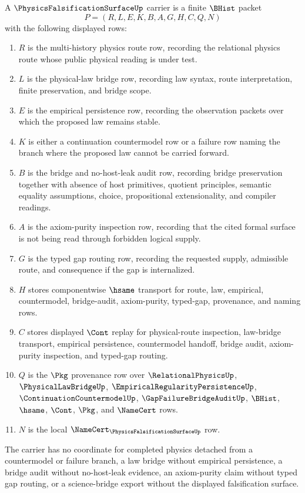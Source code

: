 \begin{definition}
\label{def:physics-falsification-surface-carrier}
A $\PhysicsFalsificationSurfaceUp$ carrier is a finite $\BHist$ packet
$$
P=(R,L,E,K,B,A,G,H,C,Q,N)
$$
with the following displayed rows:
\begin{enumerate}
\item $R$ is the multi-history physics route row, recording the relational physics route whose public physical reading is under test.
\item $L$ is the physical-law bridge row, recording law syntax, route interpretation, finite preservation, and bridge scope.
\item $E$ is the empirical persistence row, recording the observation packets over which the proposed law remains stable.
\item $K$ is either a continuation countermodel row or a failure row naming the branch where the proposed law cannot be carried forward.
\item $B$ is the bridge and no-host-leak audit row, recording bridge preservation together with absence of host primitives, quotient principles, semantic equality assumptions, choice, propositional extensionality, and compiler readings.
\item $A$ is the axiom-purity inspection row, recording that the cited formal surface is not being read through forbidden logical supply.
\item $G$ is the typed gap routing row, recording the requested supply, admissible route, and consequence if the gap is internalized.
\item $H$ stores componentwise $\hsame$ transport for route, law, empirical, countermodel, bridge-audit, axiom-purity, typed-gap, provenance, and naming rows.
\item $C$ stores displayed $\Cont$ replay for physical-route inspection, law-bridge transport, empirical persistence, countermodel handoff, bridge audit, axiom-purity inspection, and typed-gap routing.
\item $Q$ is the $\Pkg$ provenance row over $\RelationalPhysicsUp$, $\PhysicalLawBridgeUp$, $\EmpiricalRegularityPersistenceUp$, $\ContinuationCountermodelUp$, $\GapFailureBridgeAuditUp$, $\BHist$, $\hsame$, $\Cont$, $\Pkg$, and $\NameCert$ rows.
\item $N$ is the local $\NameCert_{\PhysicsFalsificationSurfaceUp}$ row.
\end{enumerate}
The carrier has no coordinate for completed physics detached from a countermodel or failure branch, a law bridge without empirical persistence, a bridge audit without no-host-leak evidence, an axiom-purity claim without typed gap routing, or a science-bridge export without the displayed falsification surface.
\end{definition}

